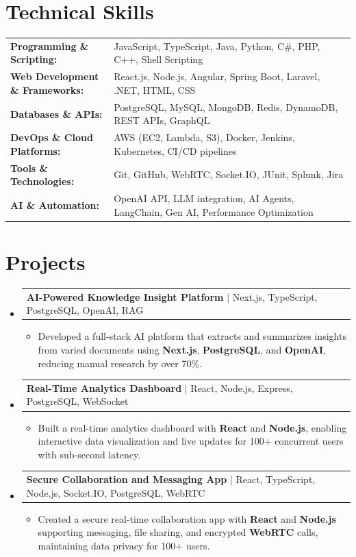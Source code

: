 \documentclass[letterpaper,10pt]{article}
\makeatletter
\newcommand{\resumeItem}[1]{
  \item{\fontsize{8pt}{9pt}\selectfont
    #1 \vspace{-3pt}
  }
}
\newcommand{\resumeProjectHeading}[2]{
    \item
    \begin{tabular*}{1.001\textwidth}{l@{\extracolsep{\fill}}r}
      \fontsize{8.5pt}{10pt}#1 & \textbf{\fontsize{8.5pt}{10pt} #2}\\
    \end{tabular*}\vspace{-7pt}
}
\newcommand{\resumeSubHeadingListStart}{\begin{itemize}[leftmargin=0pt, label={}]}
\newcommand{\resumeSubHeadingListEnd}{\end{itemize}}
\newcommand{\resumeItemListStart}{\begin{itemize}[leftmargin=*]}
\newcommand{\resumeItemListEnd}{\end{itemize}\vspace{-5pt}}
\makeatother
\begin{document}
\section{Technical Skills}
        \vspace{-14pt}
        \begin{table}[h]
            \fontsize{8pt}{9pt}\selectfont
            \begin{tabular}{p{0.3\linewidth} p{0.7\linewidth}}
                \textbf{Programming \& Scripting:} & JavaScript, TypeScript, Java, Python, C\#, PHP, C++, Shell Scripting \\
                \textbf{Web Development \& Frameworks:} & React.js, Node.js, Angular, Spring Boot, Laravel, .NET, HTML, CSS \\
                \textbf{Databases \& APIs:} & PostgreSQL, MySQL, MongoDB, Redis, DynamoDB, REST APIs, GraphQL \\
                \textbf{DevOps \& Cloud Platforms:} & AWS (EC2, Lambda, S3), Docker, Jenkins, Kubernetes, CI/CD pipelines \\
                \textbf{Tools \& Technologies:} & Git, GitHub, WebRTC, Socket.IO, JUnit, Splunk, Jira \\
                \textbf{AI \& Automation:} & OpenAI API, LLM integration, AI Agents, LangChain, Gen AI, Performance Optimization \\
            \end{tabular}
        \end{table}
 \vspace{-18pt}

\section{Projects}
    \vspace{-5pt}
    \resumeSubHeadingListStart
          \resumeProjectHeading
            {\textbf{AI-Powered Knowledge Insight Platform} $|$ Next.js, TypeScript, PostgreSQL, OpenAI, RAG}{}
            \resumeItemListStart
                \resumeItem{Developed a full-stack AI platform that extracts and summarizes insights from varied documents using \textbf{Next.js}, \textbf{PostgreSQL}, and \textbf{OpenAI}, reducing manual research by over 70\%.}
            \resumeItemListEnd
        \vspace{-12pt}
    
        \resumeProjectHeading
            {\textbf{Real-Time Analytics Dashboard} $|$ React, Node.js, Express, PostgreSQL, WebSocket}{}
        \resumeItemListStart
                \resumeItem{Built a real-time analytics dashboard with \textbf{React} and \textbf{Node.js}, enabling interactive data visualization and live updates for 100+ concurrent users with sub-second latency.}
        \resumeItemListEnd
      \vspace{-12pt}
      \resumeProjectHeading
        {\textbf{Secure Collaboration and Messaging App} $|$ React, TypeScript, Node.js, Socket.IO, PostgreSQL, WebRTC}{}
    \resumeItemListStart
            \resumeItem{Created a secure real-time collaboration app with \textbf{React} and \textbf{Node.js} supporting messaging, file sharing, and encrypted \textbf{WebRTC} calls, maintaining data privacy for 100+ users.}
    \resumeItemListEnd
    \resumeSubHeadingListEnd
\end{document}

